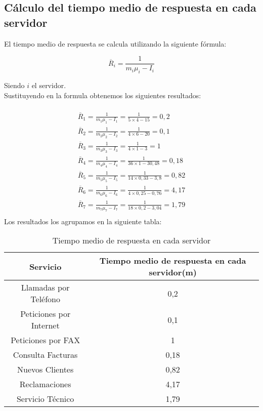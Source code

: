 \subsection{Cálculo del tiempo medio de respuesta en cada servidor}

El tiempo medio de respuesta se calcula utilizando la siguiente fórmula:

\begin{equation}
\overline{R}_{i} = \frac{1}{m_{i}\mu_{i}-I_{i}}
\end{equation}

Siendo $i$ el servidor.\\

Sustituyendo en la formula obtenemos los siguientes resultados:

\begin{multline}\\
\overline{R}_{1} = \frac{1}{m_{1}\mu_{1}-I_{1}} = \frac{1}{5\times 4 - 15} = 0,2\\
\overline{R}_{2} = \frac{1}{m_{2}\mu_{2}-I_{2}} = \frac{1}{4\times 6 - 20} = 0,1\\
\overline{R}_{3} = \frac{1}{m_{3}\mu_{3}-I_{3}} = \frac{1}{4\times 1 - 3} = 1\\
\overline{R}_{4} = \frac{1}{m_{4}\mu_{4}-I_{4}} = \frac{1}{36\times 1 - 30,48} = 0,18\\
\overline{R}_{5} = \frac{1}{m_{5}\mu_{5}-I_{5}} = \frac{1}{14\times 0,33 - 3,8} = 0,82\\
\overline{R}_{6} = \frac{1}{m_{6}\mu_{6}-I_{6}} = \frac{1}{4\times 0,25 - 0,76} = 4,17\\
\overline{R}_{7} = \frac{1}{m_{7}\mu_{7}-I_{7}} = \frac{1}{18\times 0,2 - 3,04} = 1,79\\
\end{multline}
Los resultados los agrupamos en la siguiente tabla:

\begin{table}[H]
  \begin{center}
  \begin{tabular}{|c|c|}
    \hline
    \textbf{Servicio}       & \textbf{Tiempo medio de respuesta en cada servidor(m)} \\ \hline
    Llamadas por Teléfono   & 0,2                   \\ \hline
    Peticiones por Internet & 0,1                  \\ \hline
    Peticiones por FAX      & 1                   \\ \hline
    Consulta Facturas      & 0,18                   \\ \hline
    Nuevos Clientes      & 0,82                   \\ \hline
    Reclamaciones      & 4,17                   \\ \hline
    Servicio Técnico      & 1,79                   \\ \hline
  \end{tabular}
\end{center}
  \caption{Tiempo medio de respuesta en cada servidor}
  \end{table}
  
